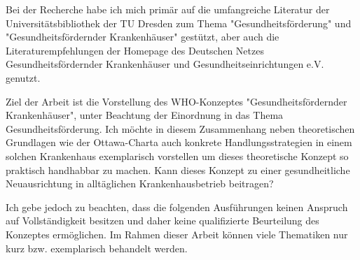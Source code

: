 Bei der Recherche habe ich mich primär auf die umfangreiche Literatur der Universitätsbibliothek der TU Dresden zum Thema "Gesundheitsförderung" und "Gesundheitsfördernder Krankenhäuser" gestützt, aber auch die Literaturempfehlungen der Homepage des Deutschen Netzes Gesundheitsfördernder Krankenhäuser und Gesundheitseinrichtungen e.V. genutzt.
 
Ziel der Arbeit ist die Vorstellung des WHO-Konzeptes "Gesundheitsfördernder Krankenhäuser", unter Beachtung der Einordnung in das Thema Gesundheitsförderung. Ich möchte in diesem Zusammenhang neben theoretischen Grundlagen wie der Ottawa-Charta auch konkrete Handlungsstrategien in einem solchen Krankenhaus exemplarisch vorstellen um dieses theoretische Konzept so praktisch handhabbar zu machen. Kann dieses Konzept zu einer gesundheitliche Neuausrichtung in alltäglichen Krankenhausbetrieb beitragen?

Ich gebe jedoch zu beachten, dass die folgenden Ausführungen keinen Anspruch auf Vollständigkeit besitzen und daher keine qualifizierte Beurteilung des Konzeptes ermöglichen. Im Rahmen dieser Arbeit können viele Thematiken nur kurz bzw. exemplarisch behandelt werden. 

